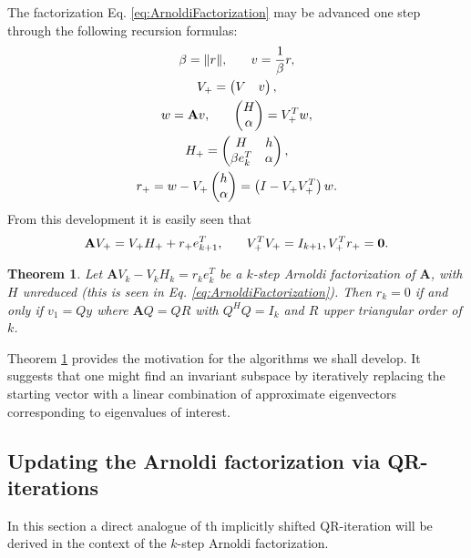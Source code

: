 \documentclass[12pt]{article}
\newcommand{\A}{\mathbf{A}}
\newtheorem{thm}{Theorem}
\begin{document}
The factorization Eq. \ref{eq:ArnoldiFactorization} may be advanced one step through the following recursion formulas:
\begin{subequations}\begin{gather}
    \beta = \|r\|, \hspace{0.25in} v = \frac{1}{\beta}r, \\ \label{eq:ArnoldiRecursion-1}
    V_+ = \begin{pmatrix}V & v\end{pmatrix}, \\
    w = \A v, \hspace{0.25in} \begin{pmatrix}H \\ \alpha \end{pmatrix} = V_+^Tw, \\
    H_+ = \begin{pmatrix} H & h \\ \beta e_k^T & \alpha \end{pmatrix}, \\
    r_+ = w - V_+\begin{pmatrix}h \\ \alpha \end{pmatrix} = \left(I-V_+V_+^T\right)w.  \label{eq:ArnoldiRecursion-4}
\end{gather}\end{subequations}
From this development it is easily seen that
\begin{equation}
    \A V_+ = V_+H_+ + r_+e_{k+1}^T,\hspace{.25in} V_+^TV_+ = I_{k+1}, V_+^Tr_+ = \mathbf{0}.
    \label{}
\end{equation}

\begin{thm}
    Let $\A V_k - V_kH_k = r_ke_k^T$ be a $k$-step Arnoldi factorization of $\A$, with $H$ unreduced (this is seen in Eq. \ref{eq:ArnoldiFactorization}).  Then $r_k = 0$ if and only if $v_1 = Qy$ where $\A Q = QR$ with $Q^HQ = I_k$ and $R$ upper triangular order of $k$.
    \label{thm:ArnoldiInvariant}
\end{thm}
Theorem \ref{thm:ArnoldiInvariant} provides the motivation for the algorithms we shall develop.  It suggests that one might find an invariant subspace by iteratively replacing the starting vector with a linear combination of approximate eigenvectors corresponding to eigenvalues of interest.

\subsection{Updating the Arnoldi factorization via QR-iterations}
In this section a direct analogue of th implicitly shifted QR-iteration will be derived in the context of the $k$-step Arnoldi factorization.
\end{document}

